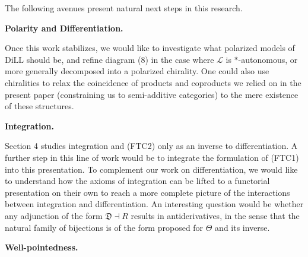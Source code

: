 \documentclass[10pt,a4paper]{article}
\begin{document}
 
 
The following avenues present natural next steps in this research.\par
 
 
 
\par\medskip\noindent\textbf{Polarity and Differentiation.}\par
 
 
Once this work stabilizes, we would like to investigate what polarized models of $\mathrm{DiLL}$ should be, and refine diagram (8) in the case where $\mathscr{L}$ is $\ast$-autonomous, or more generally decomposed into a polarized chirality. One could also use chiralities to relax the coincidence of products and coproducts we relied on in the present paper (constraining us to semi-additive categories) to the mere existence of these structures.\par
 
 
 
 
\par\medskip\noindent\textbf{Integration.}\par
 
 
Section 4 studies integration and (FTC2) only as an inverse to differentiation. A further step in this line of work would be to integrate the formulation of (FTC1) into this presentation. To complement our work on differentiation, we would like to understand how the axioms of integration can be lifted to a functorial presentation on their own to reach a more complete picture of the interactions between integration and differentiation. An interesting question would be whether any adjunction of the form $\mathfrak{D}\dashv R$ results in antiderivatives, in the sense that the natural family of bijections is of the form proposed for $\Theta$ and its inverse.\par
 
 
 
 
\par\medskip\noindent\textbf{Well-pointedness.}\par
 
\end{document}
